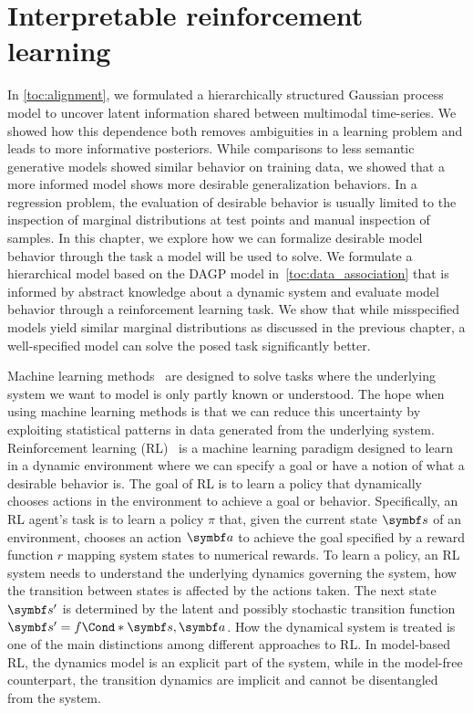 \chapter{Interpretable reinforcement learning}
\label{toc:interpretable_rl}
In \cref{toc:alignment}, we formulated a hierarchically structured Gaussian process model to uncover latent information shared between multimodal time-series.
We showed how this dependence both removes ambiguities in a learning problem and leads to more informative posteriors.
While comparisons to less semantic generative models showed similar behavior on training data, we showed that a more informed model shows more desirable generalization behaviors.
In a regression problem, the evaluation of desirable behavior is usually limited to the inspection of marginal distributions at test points and manual inspection of samples.
In this chapter, we explore how we can formalize desirable model behavior through the task a model will be used to solve.
We formulate a hierarchical model based on the DAGP model in~\cref{toc:data_association} that is informed by abstract knowledge about a dynamic system and evaluate model behavior through a reinforcement learning task.
We show that while misspecified models yield similar marginal distributions as discussed in the previous chapter, a well-specified model can solve the posed task significantly better.

Machine learning methods~\parencite{shalev-shwartz_understanding_2014} are designed to solve tasks where the underlying system we want to model is only partly known or understood.
The hope when using machine learning methods is that we can reduce this uncertainty by exploiting statistical patterns in data generated from the underlying system.
Reinforcement learning (RL)~\parencite{sutton_reinforcement_2018} is a machine learning paradigm designed to learn in a dynamic environment where we can specify a goal or have a notion of what a desirable behavior is.
The goal of RL is to learn a policy that dynamically chooses actions in the environment to achieve a goal or behavior.
Specifically, an RL agent's task is to learn a policy $\pi$ that, given the current state $\mat{s}$ of an environment, chooses an action $\mat{a}$ to achieve the goal specified by a reward function $r$ mapping system states to numerical rewards.
To learn a policy, an RL system needs to understand the underlying dynamics governing the system, how the transition between states is affected by the actions taken.
The next state $\mat{s}^\prime$ is determined by the latent and possibly stochastic transition function $\mat{s}^\prime = \Fun*{f}{\mat{s}, \mat{a}}$.
How the dynamical system is treated is one of the main distinctions among different approaches to RL.
In model-based RL, the dynamics model is an explicit part of the system, while in the model-free counterpart, the transition dynamics are implicit and cannot be disentangled from the system.

